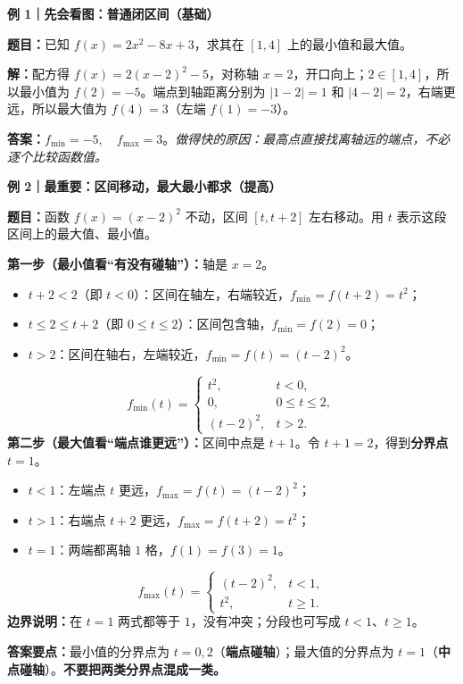 \begin{examplebox}
\textbf{\textcolor{CExample}{例 1｜先会看图：普通闭区间（基础）}}

\textbf{题目：}已知 $f(x)=2x^2-8x+3$，求其在 $[1,4]$ 上的最小值和最大值。

\textbf{解：}配方得 $f(x)=2(x-2)^2-5$，对称轴 $x=2$，开口向上；$2\in[1,4]$，所以最小值为 $f(2)=-5$。端点到轴距离分别为 $|1-2|=1$ 和 $|4-2|=2$，右端更远，所以最大值为 $f(4)=3$（左端 $f(1)=-3$）。
\begin{center}

\end{center}
\textbf{答案：}$\boxed{f_{\min}=-5,\quad f_{\max}=3}$。\textit{做得快的原因：最高点直接找离轴远的端点，不必逐个比较函数值。}

\medskip
\textbf{\textcolor{CExample}{例 2｜最重要：区间移动，最大最小都求（提高）}}

\textbf{题目：}函数 $f(x)=(x-2)^2$ 不动，区间 $[t,t+2]$ 左右移动。用 $t$ 表示这段区间上的最大值、最小值。

\textbf{第一步（最小值看“有没有碰轴”）：}轴是 $x=2$。
\begin{itemize}[leftmargin=*,itemsep=0.23em]
 \item $t+2<2$（即 $t<0$）：区间在轴左，右端较近，$f_{\min}=f(t+2)=t^2$；
 \item $t\le2\le t+2$（即 $0\le t\le2$）：区间包含轴，$f_{\min}=f(2)=0$；
 \item $t>2$：区间在轴右，左端较近，$f_{\min}=f(t)=(t-2)^2$。
\end{itemize}
\[
 \boxed{f_{\min}(t)=
 \begin{cases}
 t^2,&t<0,\\ 0,&0\le t\le2,\\ (t-2)^2,&t>2.
 \end{cases}}
\]
\textbf{第二步（最大值看“端点谁更远”）：}区间中点是 $t+1$。令 $t+1=2$，得到\textbf{分界点 $t=1$}。
\begin{itemize}[leftmargin=*,itemsep=0.23em]
 \item $t<1$：左端点 $t$ 更远，$f_{\max}=f(t)=(t-2)^2$；
 \item $t>1$：右端点 $t+2$ 更远，$f_{\max}=f(t+2)=t^2$；
 \item $t=1$：两端都离轴 $1$ 格，$f(1)=f(3)=1$。
\end{itemize}
\[
 \boxed{f_{\max}(t)=
 \begin{cases}
 (t-2)^2,&t<1,\\ t^2,&t\ge1.
 \end{cases}}
\]
\textbf{边界说明：}在 $t=1$ 两式都等于 $1$，没有冲突；分段也可写成 $t<1$、$t\ge1$。
\begin{center}

\end{center}
\textbf{答案要点：}最小值的分界点为 $t=0,2$（\textbf{端点碰轴}）；最大值的分界点为 $t=1$（\textbf{中点碰轴}）。\textbf{不要把两类分界点混成一类。}


\end{examplebox}

